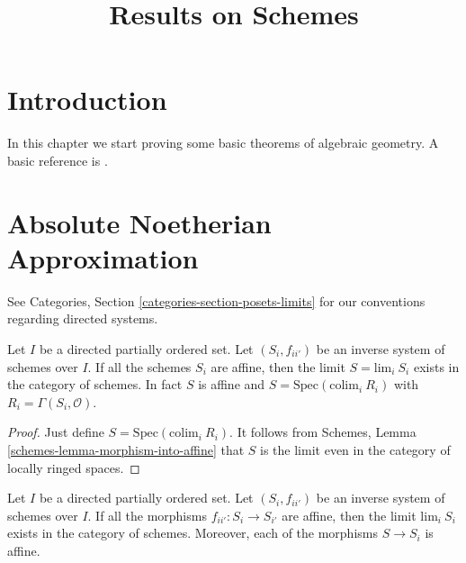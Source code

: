 

%


\title{Results on Schemes}


\maketitle

\tableofcontents

\section{Introduction}
\label{section-introduction}

\noindent
In this chapter we start proving some basic theorems of algebraic geometry.
A basic reference is \cite{EGA}.















\section{Absolute Noetherian Approximation}
\label{section-approximation}

\noindent
See Categories, Section \ref{categories-section-posets-limits}
for our conventions regarding directed systems.

\begin{lemma}
\label{lemma-directed-inverse-system-affine schemes-has-limit}
Let $I$ be a directed partially ordered set.
Let $(S_i, f_{ii'})$ be an inverse system of
schemes over $I$.  If all the schemes $S_i$
are affine, then the limit $S = \text{lim}_i\ S_i$ exists
in the category of schemes.
In fact $S$ is affine and $S = \text{Spec}(\text{colim}_i\ R_i)$
with $R_i = \Gamma(S_i, \mathcal{O})$.
\end{lemma}

\begin{proof}
Just define $S = \text{Spec}(\text{colim}_i\ R_i)$.
It follows from Schemes, Lemma \ref{schemes-lemma-morphism-into-affine}
that $S$ is the limit even in the category of locally ringed spaces.
\end{proof}

\begin{lemma}
\label{lemma-directed-inverse-system-has-limit}
Let $I$ be a directed partially ordered set.
Let $(S_i, f_{ii'})$ be an inverse system of
schemes over $I$. If all the morphisms $f_{ii'} : S_i \to S_{i'}$
are affine, then the limit $\text{lim}_i\ S_i$ exists
in the category of schemes.
Moreover, each of the morphisms $S \to S_i$ is affine.
\end{lemma}

